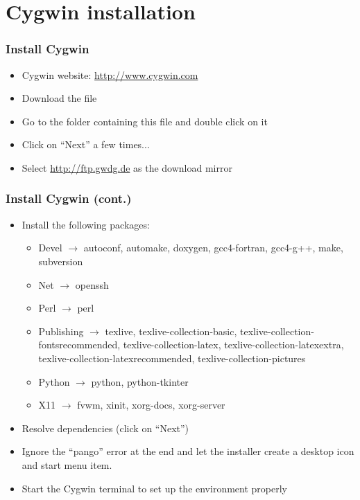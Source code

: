 \section{Cygwin installation}

\begin{frame}
    \frametitle{Install Cygwin}

    \begin{itemize}
        \item Cygwin website: \url{http://www.cygwin.com}
        \item Download the  file
        \item Go to the folder containing this file and double click on it
        \item Click on \enquote{Next} a few times...
        \item Select \url{http://ftp.gwdg.de} as the download mirror
    \end{itemize}
\end{frame}

\begin{frame}
    \frametitle{Install Cygwin (cont.)}

    \begin{itemize}
        \item Install the following packages:
            \begin{itemize}
                \item Devel $\rightarrow$ autoconf, automake, doxygen,
                    gcc4-fortran, gcc4-g++, make, subversion
                \item Net $\rightarrow$ openssh
                \item Perl $\rightarrow$ perl
                \item Publishing $\rightarrow$ texlive,
                    texlive-collection-basic,
                    texlive-collection-fontsrecommended,
                    texlive-collection-latex,
                    texlive-collection-latexextra,
                    texlive-collection-latexrecommended,
                    texlive-collection-pictures
                \item Python $\rightarrow$ python, python-tkinter
                \item X11 $\rightarrow$ fvwm, xinit, xorg-docs, xorg-server
            \end{itemize}
        \item Resolve dependencies (click on \enquote{Next})
        \item Ignore the \enquote{pango} error at the end and let the
            installer create a desktop icon and start menu item.
        \item Start the Cygwin terminal to set up the environment properly
    \end{itemize}
\end{frame}

